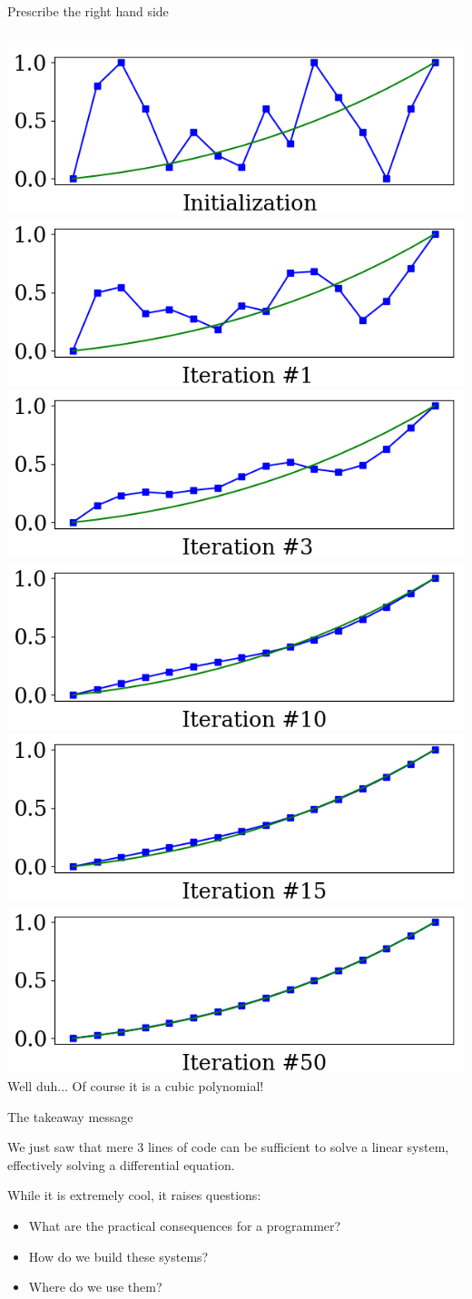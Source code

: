 \documentclass[UKenglish,aspectratio=169]{beamer}
\begin{document}
\begin{frame}{Prescribe the right hand side}
\inputminted[frame=single]{python}{listings/example_3.4.py}
\pause
\includegraphics[width=.32\linewidth]{../manuscript/img/example_3_4_0.png}
\includegraphics[width=.32\linewidth]{../manuscript/img/example_3_4_1.png}
\includegraphics[width=.32\linewidth]{../manuscript/img/example_3_4_2.png}
\includegraphics[width=.32\linewidth]{../manuscript/img/example_3_4_3.png}
\includegraphics[width=.32\linewidth]{../manuscript/img/example_3_4_4.png}
\includegraphics[width=.32\linewidth]{../manuscript/img/example_3_4_5.png}
Well duh... Of course it is a cubic polynomial!
\end{frame}



\begin{frame}{The takeaway message}

\vspace{25pt}
We just saw that mere 3 lines of code  can be sufficient to solve a linear system, 
effectively solving a differential equation.

\vspace{25pt}
While it is extremely cool, it raises questions:
\begin{itemize}
\item What are the practical consequences for a programmer?
\item How do we build these systems?
\item Where do we use them?
\end{itemize}
\end{frame}
\end{document}
